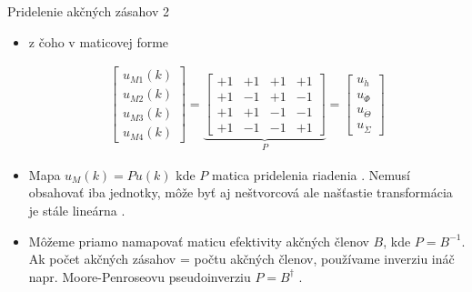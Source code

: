    \begin{frame}{Pridelenie akčných zásahov 2}
  \begin{itemize}
  \item<1-> z čoho v maticovej forme

        \begin{align}
     \begin{bmatrix}
       u_{M1}(k) \\
       u_{M2}(k) \\
       u_{M3}(k) \\
       u_{M4}(k)
     \end{bmatrix}=\underbrace{\begin{bmatrix}
                     +1 & +1 & +1 & +1 \\
                     +1 & -1 & +1 & -1 \\
                     +1 & +1 & -1 & -1 \\
                     +1 & -1 & -1 & +1
                   \end{bmatrix}}_P =
                \begin{bmatrix}
                     u_{\dot{h}} \\
       u_{\dot{\Phi}} \\
       u_{\dot{\Theta}} \\
       u_{\dot{\Sigma}}
     \end{bmatrix}
     \end{align}

    \item<2-> Mapa $u_M(k)=Pu(k)$ kde $P$ matica pridelenia riadenia . Nemusí obsahovať iba jednotky, môže byť aj neštvorcová ale našťastie transformácia je stále lineárna \citep{Bresciani2020}.
    \item<3-> Môžeme priamo namapovať maticu efektivity akčných členov  $B$, kde $P=B^{-1}$. Ak počet akčných zásahov = počtu akčných členov, používame inverziu ináč napr. Moore-Penroseovu pseudoinverziu $P=B^{\dagger}$ \citep{Bresciani2020}.
\end{itemize}
  \end{frame}



